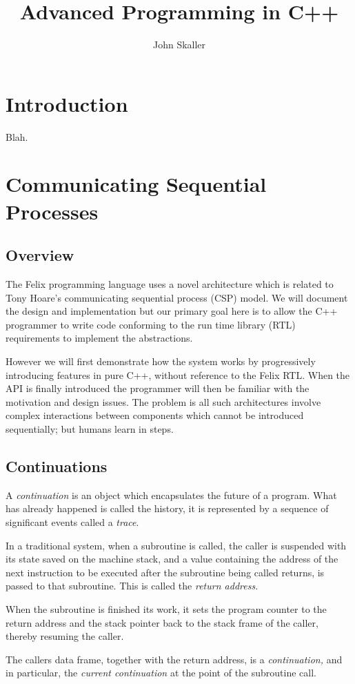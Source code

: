 \documentclass[oneside]{book}
\title{Advanced Programming in C++}
\author{John Skaller}
\begin{document}
\maketitle
\tableofcontents
\chapter{Introduction}
Blah.
\chapter{Communicating Sequential Processes}
\section{Overview}
The Felix programming language uses a novel architecture which is related to
Tony Hoare's communicating sequential process (CSP) model. We will document
the design and implementation but our primary goal here is to allow the
C++ programmer to write code conforming to the run time library (RTL) requirements
to implement the abstractions.

However we will first demonstrate how the system works by progressively
introducing features in pure C++, without reference to the Felix RTL.
When the API is finally introduced the programmer will then be familiar
with the motivation and design issues. The problem is all such architectures
involve complex interactions between components which cannot be introduced
sequentially; but humans learn in steps.

\section{Continuations}
A {\em continuation} is an object which encapsulates the future of a program.
What has already happened is called the history, it is represented by a sequence
of significant events called a {\em trace}.

In a traditional system, when a subroutine is called, the caller is suspended
with its state saved on the machine stack, and a value containing the address
of the next instruction to be executed after the subroutine being called
returns, is passed to that subroutine. This is called the {\em return address.}

When the subroutine is finished its work, it sets the program counter
to the return address and the stack pointer back to the stack frame of the
caller, thereby resuming the caller.

The callers data frame, together with the return address, is a {\em continuation,}
and in particular, the {\em current continuation} at the point of the subroutine 
call.
\end{document}
